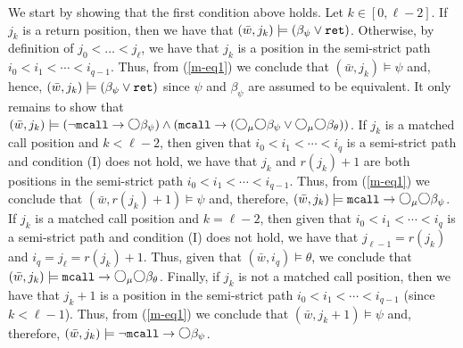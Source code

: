 \documentclass{LMCS}
\newcommand{\M}{{\mu}}
\newcommand{\w}{{\bar{w}}}
\newcommand{\dm}{\Diamond}
\newcommand{\next}{\text{\raisebox{1pt}{$\bigcirc$}}}
\theoremstyle{plain}
\theoremstyle{definition}
\newcommand{\mcall}{{\tt{mcall}}}
\newcommand{\rett}{{\tt ret}}
\newcommand{\dmm}{\dm_{\M}}
\renewcommand{\dm}{\next}
\renewcommand{\dmm}{\dm_\M}
\begin{document}
\begin{enumerate}[(a)]
We start by showing that the first condition above holds.  Let $k \in
[0,\ell-2]$. If $j_k$ is a return position, then we have that $(\w,
j_k) \models (\beta_\psi \vee \rett)$. Otherwise, by definition of
$j_0 < \ldots < j_\ell$, we have that $j_k$ is a position in the
semi-strict path $i_0 < i_1 < \cdots < i_{q-1}$. Thus, from
(\ref{m-eq1}) we conclude that $(\w, j_k) \models \psi$ and, hence,
$(\w, j_k) \models (\beta_\psi \vee \rett)$ since $\psi$ and
$\beta_\psi$ are assumed to be equivalent. It only remains to show
that $(\w, j_k) \models (\neg \mcall \to \dm \beta_\psi) \wedge
(\mcall \to (\dmm \dm \beta_\psi \vee \dmm \dm \beta_\theta))$. If
$j_k$ is a matched call position and $k < \ell-2$, then given that
$i_0 < i_1 < \cdots < i_q$ is a semi-strict path and condition
(I) does not hold, we have that $j_k$ and $r(j_k)+1$ are both
positions in the semi-strict path $i_0 < i_1 < \cdots <
i_{q-1}$. Thus, from (\ref{m-eq1}) we conclude that $(\w, r(j_k)+1)
\models \psi$ and, therefore, $(\w,j_k) \models \mcall \to \dmm \dm
\beta_\psi$. If $j_k$ is a matched call position and $k = \ell-2$,
then given that $i_0 < i_1 < \cdots < i_q$ is a semi-strict
path and condition (I) does not hold, we have that $j_{\ell-1} =
r(j_k)$ and $i_q = j_\ell = r(j_k) + 1$. Thus, given that $(\w, i_q)
\models \theta$, we conclude that $(\w,j_k) \models \mcall \to \dmm
\dm \beta_\theta$. Finally, if $j_k$ is not a matched
call position, then we have that $j_k+1$ is a position in the
semi-strict path $i_0 < i_1 < \cdots < i_{q-1}$ (since $k <
\ell-1$). Thus, from
(\ref{m-eq1}) we conclude that $(\w, j_k+1) \models \psi$ and,
therefore, $(\w,j_k) \models \neg \mcall \to \dm \beta_\psi$.   


\end{enumerate}
\end{document}
